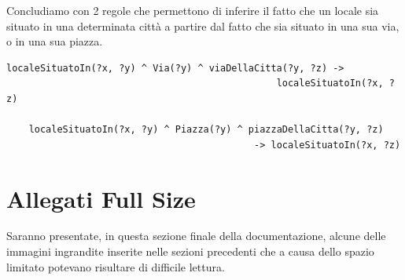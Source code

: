\documentclass[12pt]{article}
\begin{document}
\newpage
Concludiamo con 2 regole che permettono di inferire il fatto che un locale sia situato in una determinata città a partire dal fatto che sia situato in una sua via, o in una sua piazza.
\begin{lstlisting}[language=SPARQL]
    localeSituatoIn(?x, ?y) ^ Via(?y) ^ viaDellaCitta(?y, ?z) ->
                                                localeSituatoIn(?x, ?z)
    
    localeSituatoIn(?x, ?y) ^ Piazza(?y) ^ piazzaDellaCitta(?y, ?z)
                                            -> localeSituatoIn(?x, ?z)
\end{lstlisting}
\section{Allegati Full Size}
Saranno presentate, in questa sezione finale della documentazione, alcune delle immagini ingrandite inserite nelle sezioni precedenti che a causa dello spazio limitato potevano risultare di difficile lettura.
\end{document}
